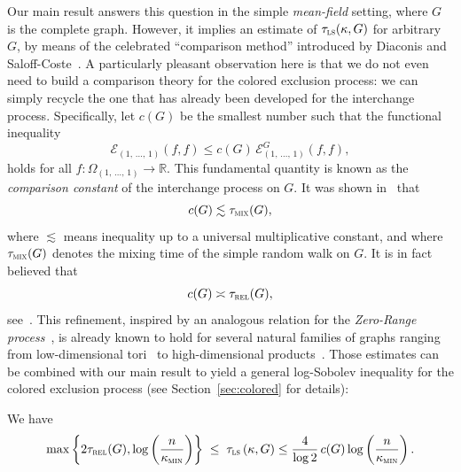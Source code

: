 \documentclass[10pt]{amsart}
\theoremstyle{definition}\newtheorem{defi}[theo]{Definition}\newtheorem{rema}[theo]{Remark}\newtheorem{exam}[theo]{Example}\newtheorem{exem}[theo]{Example}\newtheorem{nota}[theo]{Notation}
\newcommand{\R}{\mathbb{R}}
\newcommand{\cE}{\mathcal{E}}
\newcommand{\tmix}{\tau_{\textsc{mix}}}
\newcommand{\trel}{\tau_{\textsc{rel}}}
\newcommand{\tls}{\tau_{\textsc{ls}}}
\newcommand{\am}{{\kappa_{\textsc{min}}}}
\begin{document}
Our main result answers this question in the simple \emph{mean-field} setting, where $G$ is the complete graph. However, it implies an estimate of $\tls(\kappa,G)$ for arbitrary $G$, by means of the celebrated ``comparison method'' introduced by Diaconis and Saloff-Coste~\cite{MR1245303,MR1233621}. A particularly pleasant observation here is that we do not even need to build a comparison theory for the colored exclusion process: we can simply recycle the one that has already been developed for the interchange process. Specifically, let $c(G)$ be the smallest number such that the functional inequality
\begin{equation}\label{comp}
\cE_{(1,\,\ldots,\,1)}(f,f) \le c(G)\,\cE_{(1,\,\ldots,\,1)}^G(f,f),
\end{equation}
holds for all $f\colon\Omega_{(1,\,\ldots,\,1)}\to\R$. This fundamental quantity is known as the \emph{comparison constant} of the interchange process on $G$. It was shown in~\cite{2018arXiv181110537A} that
\[
c(G) \lesssim \tmix(G),
\]
where $\lesssim$ means inequality up to a universal multiplicative constant, and where $\tmix(G)$ denotes the mixing time of the simple random walk on $G$. It is in fact believed that
\begin{equation}\label{conj}
c(G) \asymp \trel(G),
\end{equation}
see~\cite[Conjecture~2]{2019arXiv190502146H}. This refinement, inspired by an analogous relation for the \emph{Zero-Range process}~\cite{MR3984254}, is already known to hold for several natural families of graphs ranging from low-dimensional tori~\cite{2018arXiv181110537A} to high-dimensional products~\cite{2019arXiv190502146H}. Those estimates can be combined with our main result to yield a general log-Sobolev inequality for the colored exclusion process (see Section~\ref{sec:colored} for details):

\begin{coro}\label{co:colored}
We have
\[
\max\left\{2\trel(G),\log\left(\frac{n}{\am}\right)\right\} \; \le \; \tls\left(\kappa, G\right) \le \frac{4}{\log 2}\,c(G)\log\left(\frac{n}{\am}\right).
\]
\end{coro}
\end{document}
